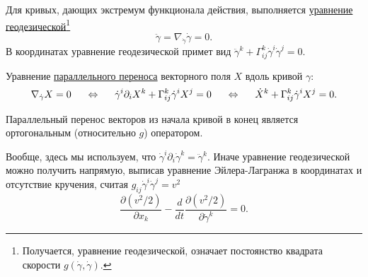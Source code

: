 
\begin{to_con} 
    Для кривых, дающих экстремум функционала действия, выполняется \underline{уравнение геодезической}\footnote{
        Получается, уравнение геодезической, означает постоянство квадрата скорости $g(\dot{\gamma}, \dot{\gamma})$.
    } $$\ddot{\gamma} = \nabla_{\dot{\gamma}} \dot{\gamma} = 0.$$ 
    В координатах уравнение геодезической примет вид $\ddot{\gamma}^k + \Gamma_{ij}^k \dot{\gamma}^i \dot{\gamma}^j = 0.$
\end{to_con}

\begin{to_lem}
     Уравнение \underline{параллельного переноса} векторного поля $X$ вдоль кривой $\gamma$: 
     \begin{equation*}
         \nabla_{\dot{\gamma}} X = 0
         \hspace{0.5cm} \Leftrightarrow \hspace{0.5cm} 
         \dot{\gamma}^i \partial_i X^k + \Gamma_{ij}^k \dot{\gamma}^i X^j = 0
         \hspace{0.5cm} \Leftrightarrow \hspace{0.5cm} 
         \dot{X}^k + \Gamma_{ij}^k \dot{\gamma}^i X^j = 0.
     \end{equation*}
\end{to_lem}

\begin{to_tas} 
    Параллельный перенос векторов из начала кривой в конец является ортогональным (относительно $g$) оператором.
\end{to_tas}

Вообще, здесь мы используем, что $\dot{\gamma}^i \partial_i \dot{\gamma}^k = \ddot{\gamma}^k$. Иначе уравнение геодезической можно получить напрямую, выписав уравнение Эйлера-Лагранжа в координатах и отсутствие кручения, считая $g_{ij} \dot{\gamma}^i \dot{\gamma}^j = v^2$
\begin{equation*}
    \frac{\partial (v^2/2)}{\partial x_k}  - \frac{d }{d t} 
        \frac{\partial (v^2/2)}{\partial \dot{\gamma}^k} 
     = 0.
\end{equation*}